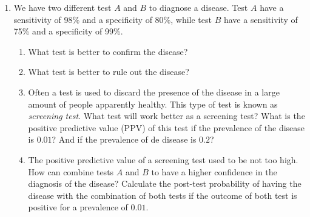 \begin{enumerate}[leftmargin=*,resume]
\item We have two different test $A$ and $B$ to diagnose a disease.
Test $A$ have a sensitivity of 98\% and a specificity of 80\%, while test $B$ have a sensitivity of 75\% and a
specificity of 99\%.
\begin{enumerate}
\item What test is better to confirm the disease?
\item What test is better to rule out the disease?
\item Often a test is used to discard the presence of the disease in a large amount of people apparently healthy.
This type of test is known as \emph{screening test}.
What test will work better as a screening test?
What is the positive predictive value (PPV) of this test if the prevalence of the disease is $0.01$? And if the
prevalence of de disease is $0.2$?
\item The positive predictive value of a screening test used to be not too high. 
How can combine tests $A$ and $B$ to have a higher confidence in the diagnosis of the disease?
Calculate the post-test probability of having the disease with the combination of both tests if the outcome of both test
is positive for a prevalence of $0.01$.
\end{enumerate}


\end{enumerate}

